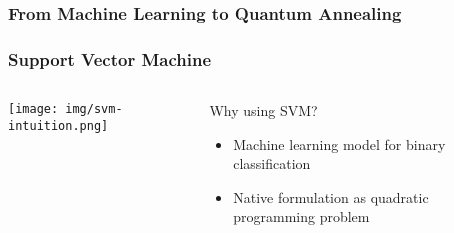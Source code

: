 \documentclass[aspectratio=169]{beamer}
\begin{document}
\begin{frame}
    \frametitle{From Machine Learning to Quantum Annealing}
    
    \centering

\end{frame}

\begin{frame}
    \frametitle{Support Vector Machine}

    \begin{columns}
        \begin{column}{0.5\textwidth}
            \centering
            \texttt{[image: img/svm-intuition.png]}
        \end{column}
        \begin{column}{0.5\textwidth}
            Why using SVM?

            \begin{itemize}
                \item Machine learning model for binary classification 
                \item Native formulation as quadratic programming problem
            \end{itemize}
        \end{column}
        
    \end{columns}

\end{frame}
\end{document}
